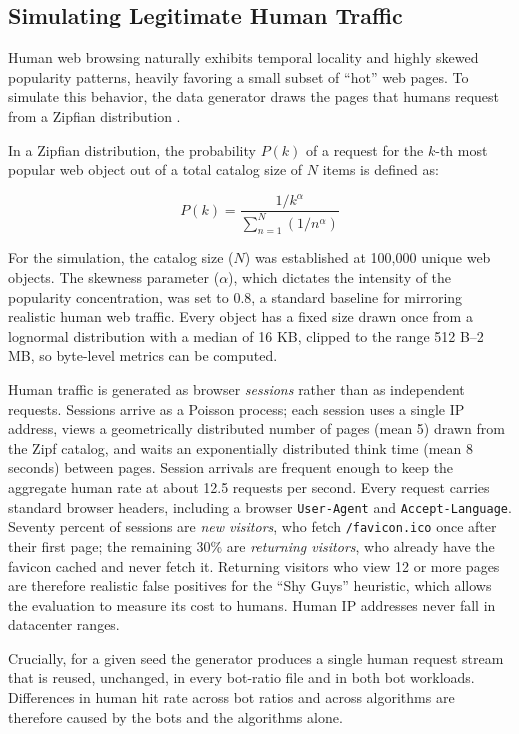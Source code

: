 \subsection{Simulating Legitimate Human Traffic}
Human web browsing naturally exhibits temporal locality and highly skewed popularity patterns, heavily favoring a small subset of ``hot'' web pages. To simulate this behavior, the data generator draws the pages that humans request from a Zipfian distribution \cite{breslau_web_1999}.

In a Zipfian distribution, the probability $P(k)$ of a request for the $k$-th most popular web object out of a total catalog size of $N$ items is defined as:

\begin{equation}
P(k) = \frac{1/k^\alpha}{\sum_{n=1}^{N} (1/n^\alpha)}
\end{equation}

For the simulation, the catalog size ($N$) was established at 100,000 unique web objects. The skewness parameter ($\alpha$), which dictates the intensity of the popularity concentration, was set to 0.8, a standard baseline for mirroring realistic human web traffic. Every object has a fixed size drawn once from a lognormal distribution with a median of 16 KB, clipped to the range 512 B--2 MB, so byte-level metrics can be computed.

Human traffic is generated as browser \emph{sessions} rather than as independent requests. Sessions arrive as a Poisson process; each session uses a single IP address, views a geometrically distributed number of pages (mean 5) drawn from the Zipf catalog, and waits an exponentially distributed think time (mean 8 seconds) between pages. Session arrivals are frequent enough to keep the aggregate human rate at about 12.5 requests per second. Every request carries standard browser headers, including a browser \texttt{User-Agent} and \texttt{Accept-Language}. Seventy percent of sessions are \emph{new visitors}, who fetch \texttt{/favicon.ico} once after their first page; the remaining 30\% are \emph{returning visitors}, who already have the favicon cached and never fetch it. Returning visitors who view 12 or more pages are therefore realistic false positives for the ``Shy Guys'' heuristic, which allows the evaluation to measure its cost to humans. Human IP addresses never fall in datacenter ranges.

Crucially, for a given seed the generator produces a single human request stream that is reused, unchanged, in every bot-ratio file and in both bot workloads. Differences in human hit rate across bot ratios and across algorithms are therefore caused by the bots and the algorithms alone.

